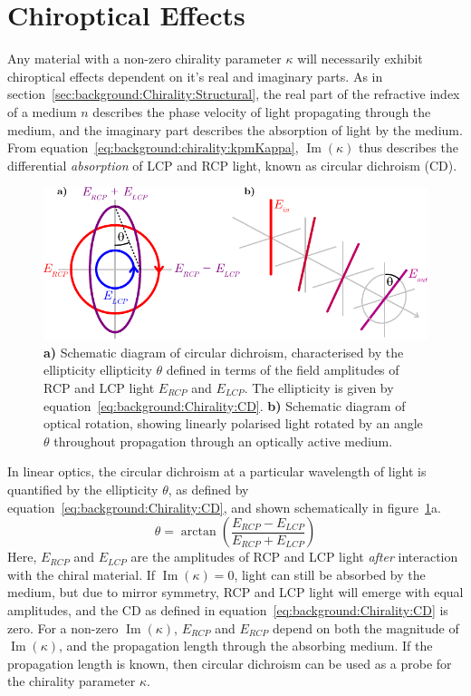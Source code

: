 \section{Chiroptical Effects}\label{sec:background:Chirality:Chiroptics}
Any material with a non-zero chirality parameter $\kappa$ will necessarily exhibit chiroptical effects dependent on it's real and imaginary parts. As in section~\ref{sec:background:Chirality:Structural}, the real part of the refractive index of a medium $n$ describes the phase velocity of light propagating through the medium, and the imaginary part describes the absorption of light by the medium. From equation~\ref{eq:background:chirality:kpmKappa}, $\operatorname{Im}(\kappa)$ thus describes the differential \textit{absorption} of LCP and RCP light, known as circular dichroism (CD). 
\begin{figure}[htb!]
    \centering
    \includegraphics[scale=1.0]{./figures/background/chiroptics/cdor.pdf}
    \caption{\label{fig:background:Chirality:cdor}\textbf{a)} Schematic diagram of circular dichroism, characterised by the ellipticity ellipticity $\theta$ defined in terms of the field amplitudes of RCP and LCP light $E_{RCP}$ and $E_{LCP}$. The ellipticity is given by equation~\ref{eq:background:Chirality:CD}. \textbf{b)} Schematic diagram of optical rotation, showing linearly polarised light rotated by an angle $\theta$ throughout propagation through an optically active medium.}
\end{figure}
In linear optics, the circular dichroism at a particular wavelength of light is quantified by the ellipticity $\theta$, as defined by equation~\ref{eq:background:Chirality:CD}, and shown schematically in figure~\ref{fig:background:Chirality:cdor}a. 
\begin{equation}\label{eq:background:Chirality:CD}
    \theta = \arctan\left( \frac{E_{RCP} - E_{LCP}}{E_{RCP} + E_{LCP}} \right)
\end{equation} 
Here, $E_{RCP}$ and $E_{LCP}$ are the amplitudes of RCP and LCP light \textit{after} interaction with the chiral material. If $\operatorname{Im}(\kappa) = 0$, light can still be absorbed by the medium, but due to mirror symmetry, RCP and LCP light will emerge with equal amplitudes, and the CD as defined in equation~\ref{eq:background:Chirality:CD} is zero. For a non-zero $\operatorname{Im}(\kappa)$, $E_{RCP}$ and $E_{RCP}$ depend on both the magnitude of $\operatorname{Im}(\kappa)$, and the propagation length through the absorbing medium. If the propagation length is known, then circular dichroism can be used as a probe for the chirality parameter $\kappa$.
